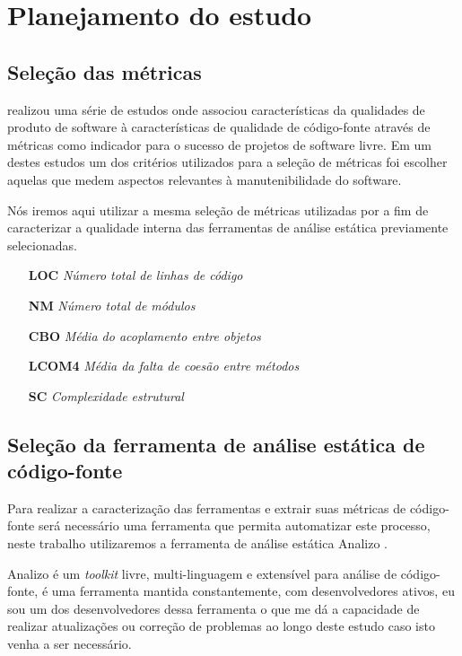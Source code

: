 \documentclass[qual, classic, a4paper]{ufbathesis}
\begin{document}
\section{Planejamento do estudo}

\subsection{Seleção das métricas}

 realizou uma série de estudos onde associou
características da qualidades de produto de software à características de
qualidade de código-fonte através de métricas como indicador para o sucesso de
projetos de software livre. Em um destes estudos um dos critérios utilizados
para a seleção de métricas foi escolher aquelas que medem aspectos relevantes à
manutenibilidade do software.

Nós iremos aqui utilizar a mesma seleção de métricas utilizadas por
 a fim de caracterizar a qualidade interna das
ferramentas de análise estática previamente selecionadas.

\begin{enumerate}
  \item[{\bf LOC}] {\it Número total de linhas de código}
  \item[{\bf NM}] {\it Número total de módulos}
  \item[{\bf CBO}] {\it Média do acoplamento entre objetos}
  \item[{\bf LCOM4}] {\it Média da falta de coesão entre métodos}
  \item[{\bf SC}] {\it Complexidade estrutural}
\end{enumerate}

\subsection{Seleção da ferramenta de análise estática de código-fonte}

Para realizar a caracterização das ferramentas e extrair suas métricas de
código-fonte será necessário uma ferramenta que permita automatizar este
processo, neste trabalho utilizaremos a ferramenta de análise estática Analizo
\cite{Terceiro2010}.

Analizo é um {\it toolkit} livre, multi-linguagem e extensível para análise de
código-fonte, é uma ferramenta mantida constantemente, com desenvolvedores
ativos, eu sou um dos desenvolvedores dessa ferramenta o que me dá a
capacidade de realizar atualizações ou correção de problemas ao longo deste
estudo caso isto venha a ser necessário.
\end{document}

